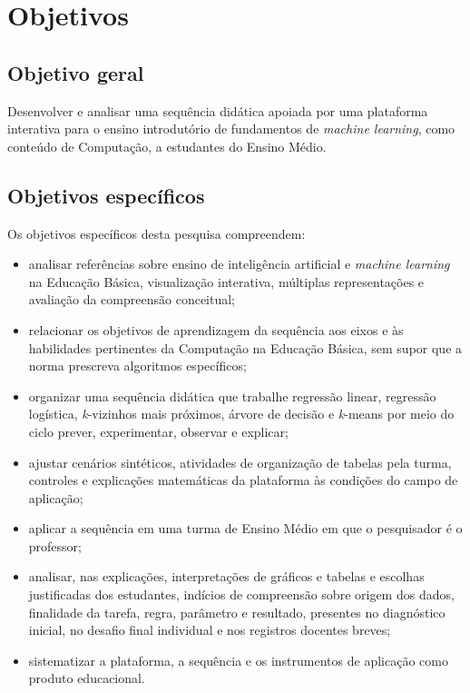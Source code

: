 \chapter{Objetivos}

\section{Objetivo geral}

Desenvolver e analisar uma sequência didática apoiada por uma plataforma interativa para o ensino introdutório de fundamentos de \textit{machine learning}, como conteúdo de Computação, a estudantes do Ensino Médio.

\section{Objetivos específicos}

Os objetivos específicos desta pesquisa compreendem:

\begin{itemize}
    \item analisar referências sobre ensino de inteligência artificial e \textit{machine learning} na Educação Básica, visualização interativa, múltiplas representações e avaliação da compreensão conceitual;
    \item relacionar os objetivos de aprendizagem da sequência aos eixos e às habilidades pertinentes da Computação na Educação Básica, sem supor que a norma prescreva algoritmos específicos;
    \item organizar uma sequência didática que trabalhe regressão linear, regressão logística, \textit{k}-vizinhos mais próximos, árvore de decisão e \textit{k}-means por meio do ciclo prever, experimentar, observar e explicar;
    \item ajustar cenários sintéticos, atividades de organização de tabelas pela turma, controles e explicações matemáticas da plataforma às condições do campo de aplicação;
    \item aplicar a sequência em uma turma de Ensino Médio em que o pesquisador é o professor;
    \item analisar, nas explicações, interpretações de gráficos e tabelas e escolhas justificadas dos estudantes, indícios de compreensão sobre origem dos dados, finalidade da tarefa, regra, parâmetro e resultado, presentes no diagnóstico inicial, no desafio final individual e nos registros docentes breves;
    \item sistematizar a plataforma, a sequência e os instrumentos de aplicação como produto educacional.
\end{itemize}
